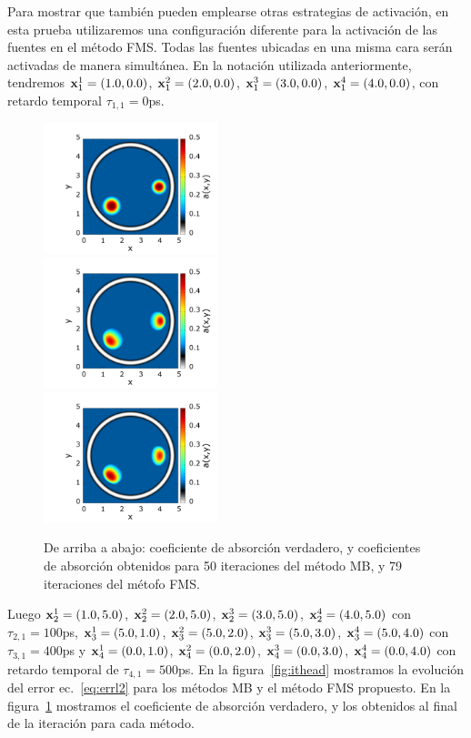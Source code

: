 Para mostrar que también pueden emplearse otras estrategias de activación, 
en esta prueba utilizaremos una configuración diferente para la 
activación de las fuentes en el método FMS. Todas las fuentes ubicadas 
en una misma cara serán activadas de manera simultánea. En la notación 
utilizada anteriormente, tendremos $\mathbf{x}_1^1=(1.0,0.0)$, 
$\mathbf{x}_1^2=(2.0,0.0)$, $\mathbf{x}_1^3=(3.0,0.0)$, $\mathbf{x}_1^4=(4.0,0.0)$, con retardo temporal $\tau_{1,1}=0$ps. 
\begin{figure}
\centering
  \includegraphics[width=0.45\textwidth]{figuras/head_true.png}\\
  \includegraphics[width=0.45\textwidth]{figuras/head_sweep.png}\\
  \includegraphics[width=0.45\textwidth]{figuras/head_ours.png}
  \caption{De arriba a abajo: coeficiente de absorción verdadero, y coeficientes de 
  absorción obtenidos para 50 iteraciones del método MB, y 79 iteraciones del métofo FMS.}
 \label{fig:rechead}
\end{figure}
Luego 
$\mathbf{x}_2^1=(1.0,5.0)$, 
$\mathbf{x}_2^2=(2.0,5.0)$, $\mathbf{x}_2^3=(3.0,5.0)$,  $\mathbf{x}_2^4=(4.0,5.0)$ con $\tau_{2,1}=100$ps, 
$\mathbf{x}_3^1=(5.0,1.0)$, 
$\mathbf{x}_3^2=(5.0,2.0)$, $\mathbf{x}_3^3=(5.0,3.0)$,  $\mathbf{x}_3^4=(5.0,4.0)$ con $\tau_{3,1}=400$ps 
y $\mathbf{x}_4^1=(0.0,1.0)$, 
$\mathbf{x}_4^2=(0.0,2.0)$, $\mathbf{x}_4^3=(0.0,3.0)$,  $\mathbf{x}_4^4=(0.0,4.0)$ con retardo temporal de $\tau_{4,1}=500$ps.
En la figura~\ref{fig:ithead} mostramos la evolución del error ec.~\eqref{eq:errl2} 
para los métodos MB y el método FMS propuesto. En la figura~\ref{fig:rechead} 
mostramos el coeficiente de absorción verdadero, y los obtenidos al final 
de la iteración para cada método.

